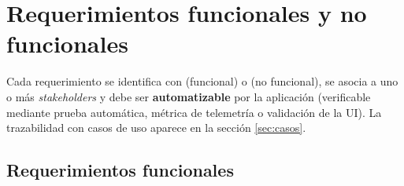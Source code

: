 \section{Requerimientos funcionales y no funcionales}
\label{sec:requerimientos}

Cada requerimiento se identifica con  (funcional) o  (no
funcional), se asocia a uno o más \textit{stakeholders} y debe ser
\textbf{automatizable} por la aplicación (verificable mediante prueba
automática, métrica de telemetría o validación de la UI). La trazabilidad
con casos de uso aparece en la sección \ref{sec:casos}.

\subsection{Requerimientos funcionales}

